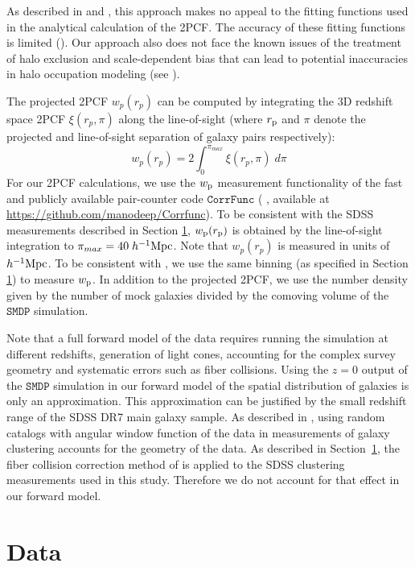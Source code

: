 \documentclass[twocolumn]{aastex61}
\newcommand{\beq}{\begin{equation}}
\newcommand{\eeq}{\end{equation}}
\begin{document}
As described in \citet{decorated} and \citet{2016arXiv160701782H}, this approach makes no appeal to the fitting functions used in the analytical calculation of the 2PCF. The accuracy of these fitting functions is limited (\citealt{tinker08,tinker10,watson13}). Our approach also does not face the known issues of the treatment of halo exclusion and scale-dependent bias that can lead to potential inaccuracies in halo occupation modeling (see \citealt{vdb13}). 

The projected 2PCF $w_{p}(r_{p})$ can be computed by integrating the 3D redshift space 2PCF $\xi(r_{p} , \pi)$ along the line-of-sight (where $r_{\rm p}$ and $\pi$ denote the projected and line-of-sight separation of galaxy pairs respectively):
\beq
w_{p}(r_{p}) = 2 \int_{0}^{\pi_{max}}\xi(r_{p} , \pi)\; d\pi
\label{los}
\eeq
For our 2PCF calculations, we use the $w_{\rm p}$ measurement functionality of the fast and publicly available pair-counter code $\mathtt{CorrFunc}$ (\citealt{corrfunc} , available at \url{https://github.com/manodeep/Corrfunc}). To be consistent with the SDSS measurements described in Section \ref{sec:data}, $w_{\rm{p}}(r_{\rm{p}})$ is obtained by the line-of-sight integration to $\pi_{max}=40 \; h^{-1}\rm{Mpc}$. Note that $w_{p}(r_{p})$ is measured in units of $h^{-1}\rm{Mpc}$. To be consistent with \citet{guo2015}, we use the same binning (as specified in Section \ref{sec:data}) to measure $w_{\rm p}$. In addition to the projected 2PCF, we use the number density given by the number of mock galaxies divided by the comoving volume of the $\mathtt{SMDP}$ simulation. 

Note that a full forward model of the data requires running the simulation at different redshifts, generation of light cones, accounting for the complex survey geometry and systematic errors such as fiber collisions. Using the $z=0$ output of the $\mathtt{SMDP}$ simulation in our forward model of the spatial distribution of galaxies is only an approximation. This approximation can be justified by the small redshift range of the SDSS DR7 main galaxy sample. As described in \citealt{zehavi2011}, using random catalogs with angular window function of the data in measurements of galaxy clustering accounts for the geometry of the data. As described in Section~\ref{sec:data}, the fiber collision correction method of \citealt{guo2012} is applied to the SDSS clustering measurements used in this study. Therefore we do not account for that effect in our forward model.

\section{Data}\label{sec:data}
\end{document}
